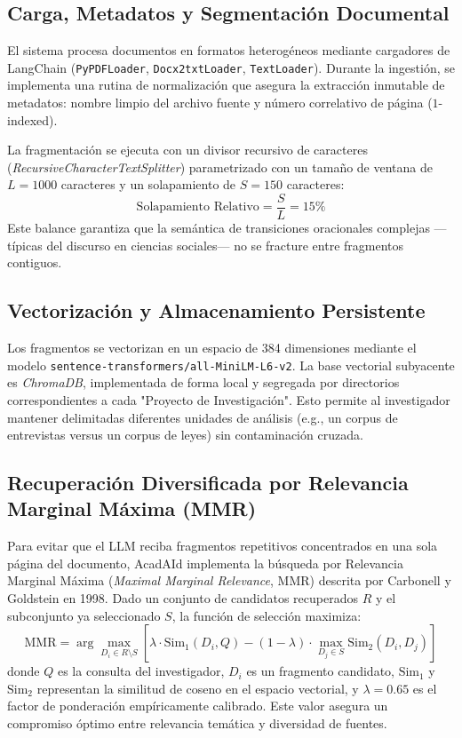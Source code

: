 \documentclass[12pt,a4paper]{article}
\begin{document}
\subsection{Carga, Metadatos y Segmentación Documental}
El sistema procesa documentos en formatos heterogéneos mediante cargadores de LangChain (\texttt{PyPDFLoader}, \texttt{Docx2txtLoader}, \texttt{TextLoader}). Durante la ingestión, se implementa una rutina de normalización que asegura la extracción inmutable de metadatos: nombre limpio del archivo fuente y número correlativo de página ($1$-indexed).

La fragmentación se ejecuta con un divisor recursivo de caracteres (\textit{RecursiveCharacterTextSplitter}) parametrizado con un tamaño de ventana de $L = 1000$ caracteres y un solapamiento de $S = 150$ caracteres:
\begin{equation}
\text{Solapamiento Relativo} = \frac{S}{L} = 15\%
\end{equation}
Este balance garantiza que la semántica de transiciones oracionales complejas —típicas del discurso en ciencias sociales— no se fracture entre fragmentos contiguos.

\subsection{Vectorización y Almacenamiento Persistente}
Los fragmentos se vectorizan en un espacio de 384 dimensiones mediante el modelo \texttt{sentence-transformers/all-MiniLM-L6-v2}. La base vectorial subyacente es \textit{ChromaDB}, implementada de forma local y segregada por directorios correspondientes a cada "Proyecto de Investigación". Esto permite al investigador mantener delimitadas diferentes unidades de análisis (e.g., un corpus de entrevistas versus un corpus de leyes) sin contaminación cruzada.

\subsection{Recuperación Diversificada por Relevancia Marginal Máxima (MMR)}
Para evitar que el LLM reciba fragmentos repetitivos concentrados en una sola página del documento, AcadAId implementa la búsqueda por Relevancia Marginal Máxima (\textit{Maximal Marginal Relevance}, MMR) descrita por Carbonell y Goldstein \cite{carbonell1998use} en 1998. Dado un conjunto de candidatos recuperados $R$ y el subconjunto ya seleccionado $S$, la función de selección maximiza:
\begin{equation}
\text{MMR} = \arg\max_{D_i \in R \setminus S} \left[ \lambda \cdot \text{Sim}_1(D_i, Q) - (1-\lambda) \cdot \max_{D_j \in S} \text{Sim}_2(D_i, D_j) \right]
\end{equation}
donde $Q$ es la consulta del investigador, $D_i$ es un fragmento candidato, $\text{Sim}_1$ y $\text{Sim}_2$ representan la similitud de coseno en el espacio vectorial, y $\lambda = 0.65$ es el factor de ponderación empíricamente calibrado. Este valor asegura un compromiso óptimo entre relevancia temática y diversidad de fuentes.
\end{document}

